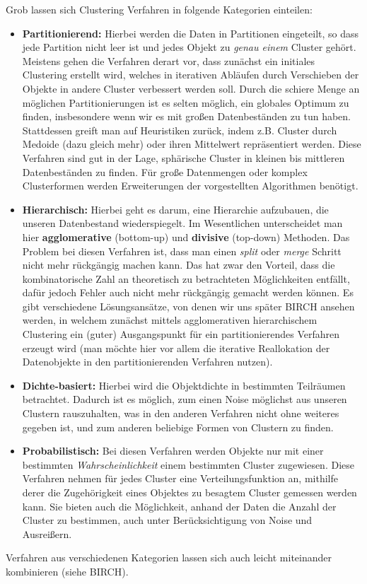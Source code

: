 Grob lassen sich Clustering Verfahren in folgende
Kategorien einteilen:
\begin{itemize}
\item \textbf{Partitionierend:} Hierbei werden die Daten in
Partitionen eingeteilt, so dass jede Partition nicht leer ist und jedes
Objekt zu \textit{genau einem} Cluster gehört. Meistens gehen
die Verfahren derart vor, dass zunächst ein initiales Clustering erstellt
wird, welches in iterativen Abläufen durch Verschieben der Objekte
in andere Cluster verbessert werden soll. Durch die schiere Menge
an möglichen Partitionierungen ist es selten möglich, ein globales
Optimum zu finden, insbesondere wenn wir es mit großen
Datenbeständen zu tun haben. Stattdessen greift man auf Heuristiken
zurück, indem z.B. Cluster durch Medoide (dazu gleich mehr) oder
ihren Mittelwert repräsentiert werden. Diese Verfahren sind gut in der
Lage, sphärische Cluster in kleinen bis mittleren Datenbeständen zu 
finden. Für große Datenmengen oder komplex Clusterformen werden
Erweiterungen der vorgestellten Algorithmen benötigt.
\item \textbf{Hierarchisch:} Hierbei geht es darum, eine Hierarchie
aufzubauen, die unseren Datenbestand wiederspiegelt. Im Wesentlichen
unterscheidet man hier \textbf{agglomerative} (bottom-up) und
\textbf{divisive} (top-down) Methoden. Das Problem bei diesen 
Verfahren ist, dass man einen \textit{split} oder \textit{merge} 
Schritt nicht mehr rückgängig machen kann. Das hat zwar den Vorteil,
dass die kombinatorische Zahl an theoretisch zu betrachteten
Möglichkeiten entfällt, dafür jedoch Fehler auch nicht mehr rückgängig
gemacht werden können. Es gibt verschiedene Lösungsansätze, von
denen wir uns später BIRCH ansehen werden, in welchem zunächst
mittels agglomerativen hierarchischem Clustering ein (guter) 
Ausgangspunkt für ein partitionierendes Verfahren erzeugt wird (man
möchte hier vor allem die iterative Reallokation der Datenobjekte in
den partitionierenden Verfahren nutzen).
\item \textbf{Dichte-basiert:} Hierbei wird die Objektdichte
in bestimmten Teilräumen betrachtet. Dadurch ist es möglich, zum
einen Noise möglichst aus unseren Clustern rauszuhalten, was in
den anderen Verfahren nicht ohne weiteres gegeben ist, und zum 
anderen beliebige Formen von Clustern zu finden. 
\item \textbf{Probabilistisch:} Bei diesen Verfahren werden
Objekte nur mit einer bestimmten \textit{Wahrscheinlichkeit} einem
bestimmten Cluster zugewiesen. Diese Verfahren nehmen für jedes
Cluster eine Verteilungsfunktion an, mithilfe derer die Zugehörigkeit
eines Objektes zu besagtem Cluster gemessen werden kann. Sie bieten
auch die Möglichkeit, anhand der Daten die Anzahl der Cluster zu 
bestimmen, auch unter Berücksichtigung von Noise und Ausreißern.
\end{itemize}
Verfahren aus verschiedenen Kategorien lassen sich auch leicht
miteinander kombinieren (siehe BIRCH).

